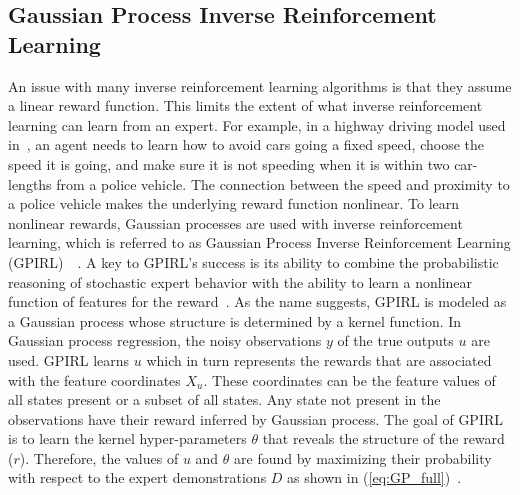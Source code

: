 \documentclass[12pt,american]{report}
\begin{document}
\subsection{Gaussian Process Inverse Reinforcement Learning}
\label{sec:gpirl}
An issue with many inverse reinforcement learning algorithms is that they assume a linear reward function.  This limits the extent of what inverse reinforcement learning can learn from an expert.  For example, in a highway driving model used in~\cite{levine2011nonlinear}, an agent needs to learn how to avoid cars going a fixed speed, choose the speed it is going, and make sure it is not speeding when it is within two car-lengths from a police vehicle.  The connection between the speed and proximity to a police vehicle makes the underlying reward function nonlinear. To learn nonlinear rewards, Gaussian processes are used with inverse reinforcement learning, which is referred to as Gaussian Process Inverse Reinforcement Learning (GPIRL)~\cite{qiao2011inverse}~\cite{levine2011nonlinear}. A key to GPIRL's success is its ability to combine the probabilistic reasoning of stochastic expert behavior with the ability to learn a nonlinear function of features for the reward~\cite{levine2011nonlinear}. As the name suggests, GPIRL is modeled as a Gaussian process whose structure is determined by a kernel function. In Gaussian process regression, the noisy observations $y$ of the true outputs $u$ are used.  GPIRL learns $u$ which in turn represents the rewards that are associated with the feature coordinates $X_u$. These coordinates can be the feature values of all states present or a subset of all states. Any state not present in the observations have their reward inferred by Gaussian process.  The goal of GPIRL is to learn the kernel hyper-parameters $\theta$ that reveals the structure of the reward ($r$). Therefore, the values of $u$ and $\theta$ are found by maximizing their probability with respect to the expert demonstrations $D$ as shown in (\ref{eq:GP_full})~\cite{levine2011nonlinear}.
\end{document}
